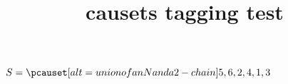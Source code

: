 \documentclass{article}
\title{causets tagging test}
\begin{document}

$S=\pcauset[alt={union of an N and a 2-chain}]{5,6,2,4,1,3}$
\end{document}
